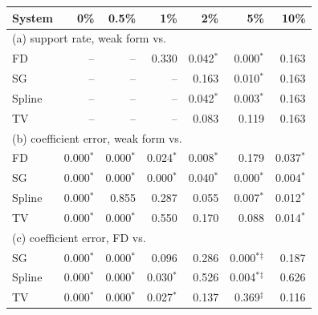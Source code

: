 \begin{tabular}{lrrrrrr}\toprule
System & 0\% & 0.5\% & 1\% & 2\% & 5\% & 10\% \\
\midrule\multicolumn{7}{l}{(a) support rate, weak form vs.} \\
FD & -- & -- & 0.330 & 0.042$^*$ & 0.000$^*$ & 0.163 \\
SG & -- & -- & -- & 0.163 & 0.010$^*$ & 0.163 \\
Spline & -- & -- & -- & 0.042$^*$ & 0.003$^*$ & 0.163 \\
TV & -- & -- & -- & 0.083 & 0.119 & 0.163 \\
\midrule\multicolumn{7}{l}{(b) coefficient error, weak form vs.} \\
FD & 0.000$^*$ & 0.000$^*$ & 0.024$^*$ & 0.008$^*$ & 0.179 & 0.037$^*$ \\
SG & 0.000$^*$ & 0.000$^*$ & 0.000$^*$ & 0.040$^*$ & 0.000$^*$ & 0.004$^*$ \\
Spline & 0.000$^*$ & 0.855 & 0.287 & 0.055 & 0.007$^*$ & 0.012$^*$ \\
TV & 0.000$^*$ & 0.000$^*$ & 0.550 & 0.170 & 0.088 & 0.014$^*$ \\
\midrule\multicolumn{7}{l}{(c) coefficient error, FD vs.} \\
SG & 0.000$^*$ & 0.000$^*$ & 0.096 & 0.286 & 0.000$^*$$^\ddagger$ & 0.187 \\
Spline & 0.000$^*$ & 0.000$^*$ & 0.030$^*$ & 0.526 & 0.004$^*$$^\ddagger$ & 0.626 \\
TV & 0.000$^*$ & 0.000$^*$ & 0.027$^*$ & 0.137 & 0.369$^\ddagger$ & 0.116 \\
\bottomrule\end{tabular}
